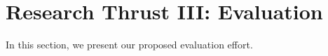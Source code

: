 \section{Research Thrust III: Evaluation}\label{sec:eval}

In this section, we present our proposed evaluation effort.
